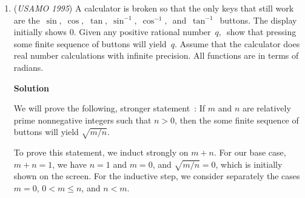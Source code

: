 \begin{enumerate}
 (which is true for $n=p-2$ already)

 Or in another word, the terms precede $a_n$ contains all number less than $n$ written in base $\, p-1 \,$ and reading the result in base $\, p$.

 


 Lemma 2: Any term containing the digit $p-1$ will form an arithmetic sequence of length-p with preceding terms

 let $p-1$ be the $x^{th}$ digit from the right (There may be more than 1 $(p-1)$)

 $a=$ the number with all $(p-1)$ replaced by 0 (e.g: $p=7$, the number$=1361264$, then $a=1301204$)

 $d=\sum p^{x-1}$ (for all $x$'s)

 $a,a+d,a+2d,\cdots,a+(p-2)d$ all precede $a_n$, thus, $a+(p-1)d$ can't be in the sequence $(a_n)_{n \geq 0}$

 Therefore, any term containing the digit $p-1$ can't be a term in the sequence ${(a_n)}_{n\ge0}$

 


 Since the digit $p-1$ won't appear (lemma 2) and as long as it doesn't appear, the arithmetic sequence of length $\, p \,$ won't be formed (lemma 1), and $a_n$ must be as small as possible, 

 Therefore, for all $\, n, \,$ $\, a_n \,$ is the number obtained by writing $\, n \,$ in base $\, p-1 \,$ and reading the result in base $\, p$.

 


	\item (\textit{USAMO 1995}) A calculator is broken so that the only keys that still work are the $\, \sin, \; \cos,$ $\tan, \; \sin^{-1}, \; \cos^{-1}, \,$ and $\, \tan^{-1} \,$ buttons.  The display initially shows 0. Given any positive rational number $\, q, \,$ show that pressing some finite sequence of buttons will yield $\, q$.   Assume that the calculator does real number calculations with infinite precision.  All functions are in terms of radians.


 



\textbf{Solution}

We will prove the following, stronger statement :  If $m$ and $n$ are relatively prime nonnegative integers such that $n>0$, then the some finite sequence of buttons will yield $\sqrt{m/n}$.

 To prove this statement, we induct strongly on $m+n$.  For our base case, $m+n=1$, we have $n=1$ and $m=0$, and $\sqrt{m/n} = 0$, which is initially shown on the screen.  For the inductive step, we consider separately the cases $m=0$, $0<m\le n$, and $n<m$.


\end{enumerate}

